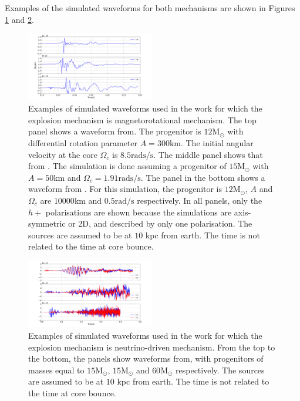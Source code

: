 \documentclass[aps,twocolumn,showpacs,groupedaddress, nofootinbib]{revtex4}  %
\begin{document}
Examples of the simulated waveforms for both mechanisms are shown in Figures \ref{fig:magwaveforms} and \ref{fig:neuwaveforms}.
\begin{figure}
\includegraphics[width=0.5\textwidth]{mag_waveforms.png}
\caption{Examples of simulated waveforms used in the work for which the explosion mechanism is magnetorotational mechanism.
The top panel shows a waveform from\cite{abdikamalov2014measuring}. 
The progenitor is $12\text{M}_\odot$ with differential rotation parameter $A=300\text{km}$. 
The initial angular velocity at the core $\Omega_c$ is $8.5\text{rads/s}$.
The middle panel shows that from \cite{dimmelmeier2008gravitational}.
The simulation is done assuming a progenitor of $15\text{M}_\odot$ with $A=50$km and $\Omega_c = 1.91\text{rads/s}$.
The panel in the bottom shows a waveform from \cite{richers2017equation}. For this simulation, the progenitor is $12\text{M}_\odot$,  $A$ and $\Omega_c$ are $10000$km and $0.5\text{rad/s}$ respectively.
In all panels, only the $h+$ polarisations are shown because the simulations are axis-symmetric or 2D, and described by only one polarisation. 
The sources are assumed to be at $10$ kpc from earth. The time is not related to the time at core bounce.
\label{fig:magwaveforms}}
\end{figure}
\begin{figure}
\includegraphics[width=0.5\textwidth]{neu_waveforms.png}
\caption{Examples of simulated waveforms used in the work for which the explosion mechanism is neutrino-driven mechanism.
From the top to the bottom, the panels show waveforms from\cite{10.1093mnrasstz990, murphy2009model, radice2019characterizing}, with progenitors of masses equal to $15\text{M}_\odot$,
$15\text{M}_\odot$ and $60\text{M}_\odot$ respectively. 
The sources are assumed to be at $10$ kpc from earth. The time is not related to the time at core bounce.
\label{fig:neuwaveforms}}
\end{figure}
\end{document}

